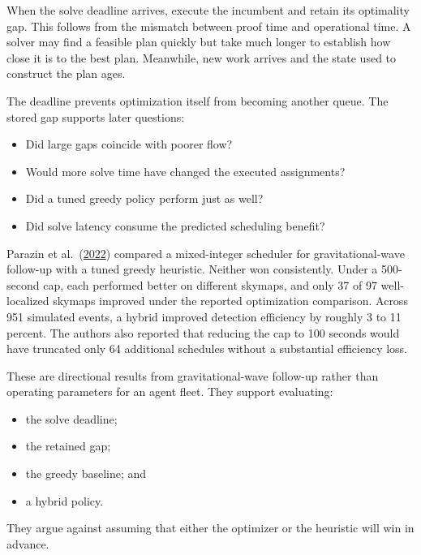 When the solve deadline arrives, execute the incumbent and retain its optimality gap. This follows from the mismatch between proof time and operational time. A solver may find a feasible plan quickly but take much longer to establish how close it is to the best plan. Meanwhile, new work arrives and the state used to construct the plan ages.


The deadline prevents optimization itself from becoming another queue. The stored gap supports later questions:

\begin{itemize}
\tightlist
\item
  Did large gaps coincide with poorer flow?
\item
  Would more solve time have changed the executed assignments?
\item
  Did a tuned greedy policy perform just as well?
\item
  Did solve latency consume the predicted scheduling benefit?
\end{itemize}

Parazin et al.~(\href{https://arxiv.org/abs/2203.00013}{2022}) compared a mixed-integer scheduler for gravitational-wave follow-up with a tuned greedy heuristic. Neither won consistently. Under a 500-second cap, each performed better on different skymaps, and only 37 of 97 well-localized skymaps improved under the reported optimization comparison. Across 951 simulated events, a hybrid improved detection efficiency by roughly 3 to 11 percent. The authors also reported that reducing the cap to 100 seconds would have truncated only 64 additional schedules without a substantial efficiency loss.


These are directional results from gravitational-wave follow-up rather than operating parameters for an agent fleet. They support evaluating:

\begin{itemize}
\tightlist
\item
  the solve deadline;
\item
  the retained gap;
\item
  the greedy baseline; and
\item
  a hybrid policy.
\end{itemize}

They argue against assuming that either the optimizer or the heuristic will win in advance.

